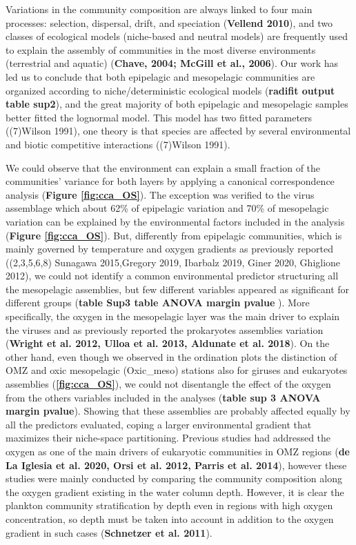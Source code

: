 \documentclass[fleqn,10pt]{wlscirep}
\begin{document}
Variations in the community composition are always linked to four main processes: selection, dispersal, drift, and speciation (\textbf{Vellend 2010}), and two classes of ecological models (niche-based and neutral models) are frequently used to explain the assembly of communities in the most diverse environments (terrestrial and aquatic) (\textbf{Chave, 2004; McGill et al., 2006}). Our work has led us to conclude that both epipelagic and mesopelagic communities are organized according to niche/deterministic ecological models (\textbf{radifit output table sup2}), and the great majority of both epipelagic and mesopelagic samples better fitted the lognormal model. This model has two fitted parameters ((7)Wilson 1991), one theory is that species are affected by several environmental and biotic competitive interactions ((7)Wilson 1991). 

We could observe that the environment can explain a small fraction of the communities’ variance for both layers by applying a canonical correspondence analysis (\textbf{Figure \ref{fig:cca_OS}}). The exception was verified to the virus assemblage which about 62\% of epipelagic variation and 70\% of mesopelagic variation can be explained by the environmental factors included in the analysis (\textbf{Figure \ref{fig:cca_OS}}). But, differently from epipelagic communities, which is mainly governed by temperature and oxygen gradients as previously reported ((2,3,5,6,8) Sunagawa 2015,Gregory 2019, Ibarbalz 2019, Giner 2020, Ghiglione 2012), we could not identify a common environmental predictor structuring all the mesopelagic assemblies, but few different variables appeared as significant for different groups (\textbf{table Sup3 table ANOVA margin pvalue }). More specifically, the oxygen in the mesopelagic layer was the main driver to explain the viruses and as previously reported the prokaryotes assemblies variation (\textbf{Wright et al. 2012, Ulloa et al. 2013, Aldunate et al. 2018}). On the other hand, even though we observed in the ordination plots the distinction of OMZ and oxic mesopelagic (Oxic\_meso) stations also for giruses and eukaryotes assemblies (\textbf{\ref{fig:cca_OS}}), we could not disentangle the effect of the oxygen from the others variables included in the analyses (\textbf{table sup 3 ANOVA margin pvalue}). Showing that these assemblies are probably affected equally by all the predictors evaluated, coping a larger environmental gradient that maximizes their niche-space partitioning. Previous studies had addressed the oxygen as one of the main drivers of eukaryotic communities in OMZ regions (\textbf{de La Iglesia et al. 2020, Orsi et al. 2012, Parris et al. 2014}), however these studies were mainly conducted by comparing the community composition along the oxygen gradient existing in the water column depth. However, it is clear the plankton community stratification by depth even in regions with high oxygen concentration, so depth must be taken into account in addition to the oxygen gradient in such cases (\textbf{Schnetzer et al. 2011}).
\end{document}
